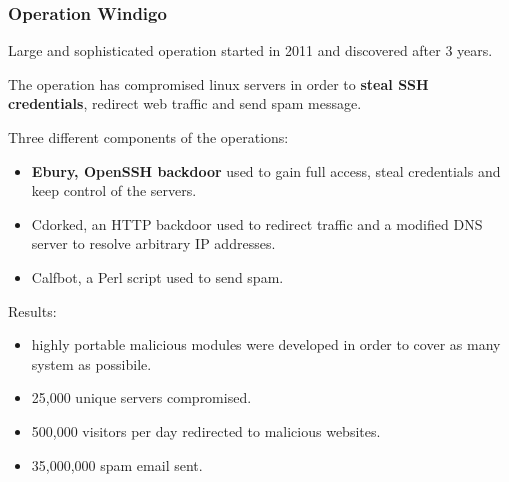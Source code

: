 \begin{frame}
	\frametitle{Operation Windigo}
	
	Large and sophisticated operation started in 2011 and discovered after 3 years.
	
	\smallskip
	
	The operation has compromised linux servers in order to \textbf{steal SSH credentials}, redirect web traffic and send spam message.
	
	\smallskip
	
  Three different components of the operations:
  
  \begin{itemize}
    \item \textbf{Ebury, OpenSSH backdoor} used to gain full access, steal credentials and keep control of the servers.
    \item Cdorked, an HTTP backdoor used to redirect traffic and a modified DNS server to resolve arbitrary IP addresses.
    \item Calfbot, a Perl script used to send spam.
  \end{itemize}	

	\smallskip
	
  Results:
  
  \begin{itemize}
    \item highly portable malicious modules were developed in order to cover as many system as possibile.
    \item 25,000 unique servers compromised.
    \item 500,000 visitors per day redirected to malicious websites.
    \item 35,000,000 spam email sent.
  \end{itemize}
\end{frame}

